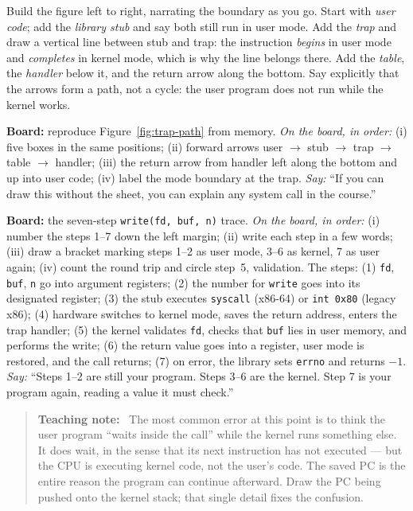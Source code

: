 \documentclass[11pt]{article}
\newenvironment{teachingaside}{\begin{quote}\small\color{primary-gold}\textbf{Teaching note:}\ }{\end{quote}}
\begin{document}
Build the figure left to right, narrating the boundary as you go. Start with \emph{user code}; add the \emph{library stub} and say both still run in user mode. Add the \emph{trap} and draw a vertical line between stub and trap: the instruction \emph{begins} in user mode and \emph{completes} in kernel mode, which is why the line belongs there. Add the \emph{table}, the \emph{handler} below it, and the return arrow along the bottom. Say explicitly that the arrows form a path, not a cycle: the user program does not run while the kernel works.

\textbf{Board:} reproduce Figure~\ref{fig:trap-path} from memory. \emph{On the board, in order:} (i) five boxes in the same positions; (ii) forward arrows user $\to$ stub $\to$ trap $\to$ table $\to$ handler; (iii) the return arrow from handler left along the bottom and up into user code; (iv) label the mode boundary at the trap. \emph{Say:} ``If you can draw this without the sheet, you can explain any system call in the course.''

\textbf{Board:} the seven-step \texttt{write(fd, buf, n)} trace. \emph{On the board, in order:} (i) number the steps 1--7 down the left margin; (ii) write each step in a few words; (iii) draw a bracket marking steps 1--2 as user mode, 3--6 as kernel, 7 as user again; (iv) count the round trip and circle step~5, validation. The steps: (1) \texttt{fd}, \texttt{buf}, \texttt{n} go into argument registers; (2) the number for \texttt{write} goes into its designated register; (3) the stub executes \texttt{syscall} (x86-64) or \texttt{int 0x80} (legacy x86); (4) hardware switches to kernel mode, saves the return address, enters the trap handler; (5) the kernel validates \texttt{fd}, checks that \texttt{buf} lies in user memory, and performs the write; (6) the return value goes into a register, user mode is restored, and the call returns; (7) on error, the library sets \texttt{errno} and returns $-1$. \emph{Say:} ``Steps 1--2 are still your program. Steps 3--6 are the kernel. Step 7 is your program again, reading a value it must check.''

\begin{teachingaside}
The most common error at this point is to think the user program ``waits inside the call'' while the kernel runs something else. It does wait, in the sense that its next instruction has not executed --- but the CPU is executing kernel code, not the user's code. The saved PC is the entire reason the program can continue afterward. Draw the PC being pushed onto the kernel stack; that single detail fixes the confusion.
\end{teachingaside}
\end{document}
